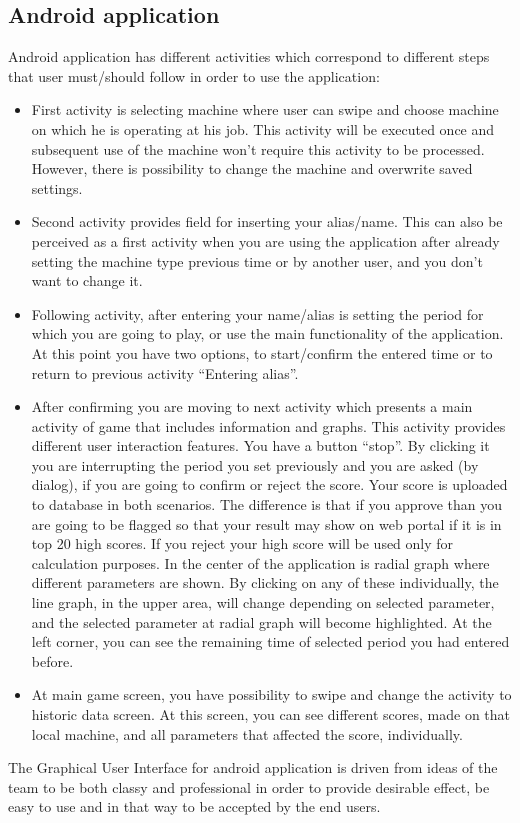 \documentclass{article}
\begin{document}
\subsection{Android application}
Android application has different activities which correspond to different steps that user must/should follow in order to use the application:
\begin{itemize}
\item First activity is selecting machine where user can swipe and choose machine on which he is operating at his job. This activity will be executed once and subsequent use of the machine won’t require this activity to be processed. However, there is possibility to change the machine and overwrite saved settings.
\item Second activity provides field for inserting your alias/name. This can also be perceived as a first activity when you are using the application after already setting the machine type previous time or by another user, and you don’t want to change it.
\item Following activity, after entering your name/alias is setting the period for which you are going to play, or use the main functionality of the application. At this point you have two options, to start/confirm the entered time or to return to previous activity “Entering alias”.
\item After confirming you are moving to next activity which presents a main activity of game that includes information and graphs. This activity provides different user interaction features. You have a button “stop”. By clicking it you are interrupting the period you set previously and you are asked (by dialog), if you are going to confirm or reject the score. Your score is uploaded to database in both scenarios. The difference is that if you approve than you are going to be flagged so that your result may show on web portal if it is in top 20 high scores. If you reject your high score will be used only for calculation purposes. In the center of the application is radial graph where different parameters are shown. By clicking on any of these individually, the line graph, in the upper area, will change depending on selected parameter, and the selected parameter at radial graph will become highlighted. At the left corner, you can see the remaining time of selected period you had entered before.
\item At main game screen, you have possibility to swipe and change the activity to historic data screen. At this screen, you can see different scores, made on that local machine, and all parameters that affected the score, individually.
\end{itemize}
The Graphical User Interface for android application is driven from ideas of the team to be both classy and professional in order to provide desirable effect, be easy to use and in that way to be accepted by the end users.
\end{document}
